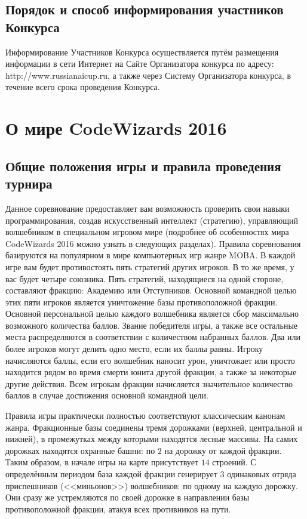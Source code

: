 \section{Порядок и способ информирования участников Конкурса}

Информирование Участников Конкурса осуществляется путём размещения информации в сети Интернет на Сайте Организатора конкурса по адресу:
http://www.russianaicup.ru, а также через Систему Организатора конкурса, в течение всего срока проведения Конкурса.

\chapter{О мире CodeWizards 2016}

\section{Общие положения игры и правила проведения турнира}

Данное соревнование предоставляет вам возможность проверить свои навыки программирования, создав искусственный интеллект (стратегию),
управляющий волшебником в специальном игровом мире (подробнее об особенностях мира CodeWizards 2016 можно узнать в следующих разделах).
Правила соревнования базируются на популярном в мире компьютерных игр жанре MOBA. В каждой игре вам будет противостоять пять стратегий
других игроков. В то же время, у вас будет четыре союзника. Пять стратегий, находящиеся на одной стороне, составляют фракцию: Академию или
Отступников. Основной командной целью этих пяти игроков является уничтожение базы противоположной фракции. Основной персональной целью
каждого волшебника является сбор максимально возможного количества баллов. Звание победителя игры, а также все остальные места
распределяются в соответствии с количеством набранных баллов. Два или более игроков могут делить одно место, если их баллы равны. Игроку
начисляются баллы, если его волшебник наносит урон, уничтожает или просто находится рядом во время смерти юнита другой фракции, а также за
некоторые другие действия. Всем игрокам фракции начисляется значительное количество баллов в случае достижения основной командной цели.

Правила игры практически полностью соответствуют классическим канонам жанра. Фракционные базы соединены тремя дорожками (верхней,
центральной и нижней), в промежутках между которыми находятся лесные массивы. На самих дорожках находятся охранные башни: по $2$ на дорожку
от каждой фракции. Таким образом, в начале игры на карте присутствует $14$ строений. С определённым периодом база каждой фракции генерирует
$3$ одинаковых отряда приспешников (<<миньонов>>) волшебников: по одному на каждую дорожку. Они сразу же устремляются по своей дорожке в
направлении базы противоположной фракции, атакуя всех противников на пути.

